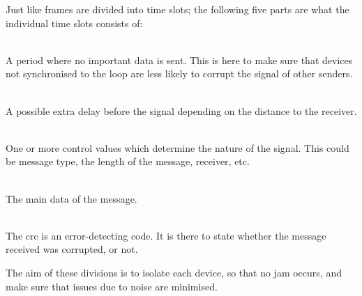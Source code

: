 
\noindent
Just like frames are divided into time slots; the following five parts are what the individual time slots consists of:

\begin{description}[labelindent=\parindent]
	\item[Guard time]\hfill\\ 
	A period where no important data is sent.
	This is here to make sure that devices not synchronised to the loop are less likely to corrupt the signal of other senders.

	\item[Sync]\hfill\\ 
	A possible extra delay before the signal depending on the distance to the receiver.

	\item[Control]\hfill\\
	One or more control values which determine the nature of the signal. 
	This could be message type, the length of the message, receiver, etc.

	\item[Data]\hfill\\
	The main data of the message.

	\item[\acrshort{crc} check]\hfill\\
	The \gls{crc} is an error-detecting code. 
	It is there to state whether the message received was corrupted, or not. 
\end{description}

\bigskip
\noindent
The aim of these divisions is to isolate each device, so that no jam occurs, and make sure that issues due to noise are minimised. 